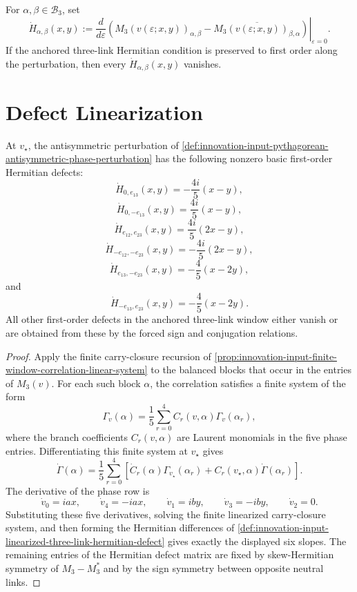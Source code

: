 \begin{definition}
\label{def:innovation-input-linearized-three-link-hermitian-defect}
For $\alpha,\beta\in\mathcal B_3$, set
$$
\dot H_{\alpha,\beta}(x,y)
:=
\left.
\frac{d}{d\varepsilon}
\left(
M_3(v(\varepsilon;x,y))_{\alpha,\beta}
-
\overline{M_3(v(\varepsilon;x,y))_{\beta,\alpha}}
\right)
\right|_{\varepsilon=0}.
$$
If the anchored three-link Hermitian condition is preserved to first
order along the perturbation, then every
$\dot H_{\alpha,\beta}(x,y)$ vanishes.
\end{definition}

\section{Defect Linearization}
\label{sec:innovation-input-pythagorean-defect-linearization}

\begin{lemma}
\label{lem:innovation-input-pythagorean-three-link-defect-slopes}
At $v_\star$, the antisymmetric perturbation of
\autoref{def:innovation-input-pythagorean-antisymmetric-phase-perturbation}
has the following nonzero basic first-order Hermitian defects:
$$
\dot H_{0,e_{13}}(x,y)
=
-\frac{4i}{5}(x-y),
$$
$$
\dot H_{0,-e_{13}}(x,y)
=
\frac{4i}{5}(x-y),
$$
$$
\dot H_{e_{12},e_{23}}(x,y)
=
\frac{4i}{5}(2x-y),
$$
$$
\dot H_{-e_{12},-e_{23}}(x,y)
=
-\frac{4i}{5}(2x-y),
$$
$$
\dot H_{e_{13},-e_{23}}(x,y)
=
-\frac45(x-2y),
$$
and
$$
\dot H_{-e_{13},e_{23}}(x,y)
=
-\frac45(x-2y).
$$
All other first-order defects in the anchored three-link window either
vanish or are obtained from these by the forced sign and conjugation
relations.
\end{lemma}

\begin{proof}
Apply the finite carry-closure recursion of
\autoref{prop:innovation-input-finite-window-correlation-linear-system}
to the balanced blocks that occur in the entries of $M_3(v)$. For each
such block $\alpha$, the correlation satisfies a finite system of the
form
$$
\Gamma_v(\alpha)
=
\frac15
\sum_{r=0}^4 C_r(v,\alpha)\Gamma_v(\alpha_r),
$$
where the branch coefficients $C_r(v,\alpha)$ are Laurent monomials in
the five phase entries. Differentiating this finite system at
$v_\star$ gives
$$
\dot\Gamma(\alpha)
=
\frac15
\sum_{r=0}^4
\left[
\dot C_r(\alpha)\Gamma_{v_\star}(\alpha_r)
+
C_r(v_\star,\alpha)\dot\Gamma(\alpha_r)
\right].
$$
The derivative of the phase row is
$$
\dot v_0=iax,
\qquad
\dot v_4=-iax,
\qquad
\dot v_1=iby,
\qquad
\dot v_3=-iby,
\qquad
\dot v_2=0.
$$
Substituting these five derivatives, solving the finite linearized
carry-closure system, and then forming the Hermitian differences of
\autoref{def:innovation-input-linearized-three-link-hermitian-defect}
gives exactly the displayed six slopes. The remaining entries of the
Hermitian defect matrix are fixed by skew-Hermitian symmetry of
$M_3-M_3^*$ and by the sign symmetry between opposite neutral links.
\end{proof}

